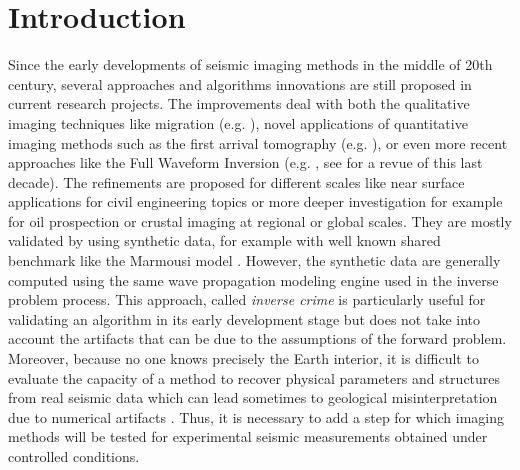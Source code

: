 \documentclass[manuscript,revised]{geophysics}
\begin{document}
\modulolinenumbers[5]
\linenumbers

\section{Introduction}


\noindent Since the early developments of seismic imaging methods in the middle of 20th century, several approaches and algorithms innovations are still proposed in current research projects. The improvements deal with both the qualitative imaging techniques like migration (e.g. \citet{Berkhout_MSS_2012,Guofeng_GPU_2013}), novel applications of quantitative imaging methods such as the first arrival tomography (e.g. \citet{Bohm_CWS_2015}), or even more recent approaches like the Full Waveform Inversion (e.g. \citet{Perez_AWI_2014}, see \citet{Virieux_FWI_2009} for a revue of this last decade). The refinements are proposed for different scales like near surface applications for civil engineering topics or more deeper investigation for example for oil prospection or crustal imaging at regional or global scales. They are mostly validated by using synthetic data, for example with well known shared benchmark like the Marmousi model \citep{martin2006marmousi2}. However, the synthetic data are generally computed using the same wave propagation modeling engine used in the inverse problem process. This approach, called \textit{inverse crime} \citep{Wirgin_TIC_2004} is particularly useful for validating an algorithm in its early development stage but does not take into account the artifacts that can be due to the assumptions of the forward problem. Moreover, because no one knows precisely the Earth interior, it is difficult to evaluate the capacity of a method to recover physical parameters and structures from real seismic data which can lead sometimes to geological misinterpretation due to numerical artifacts \citep{Morozov_ARF_2004}. Thus, it is necessary to add a step for which imaging methods will be tested for experimental seismic measurements obtained under controlled conditions.
\end{document}
